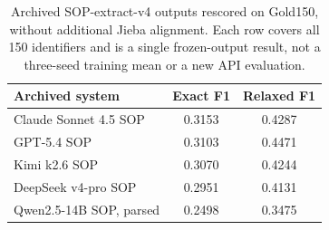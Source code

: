 \begin{table}[htbp]
\caption{Archived SOP-extract-v4 outputs rescored on Gold150, without additional Jieba alignment. Each row covers all 150 identifiers and is a single frozen-output result, not a three-seed training mean or a new API evaluation.}
\label{tab:appendix-f-sop}
\centering
\small
\begin{tabularx}{\linewidth}{@{}Lcc@{}}
\toprule
Archived system & Exact F1 & Relaxed F1 \\
\midrule
Claude Sonnet 4.5 SOP & 0.3153 & 0.4287 \\
GPT-5.4 SOP & 0.3103 & 0.4471 \\
Kimi k2.6 SOP & 0.3070 & 0.4244 \\
DeepSeek v4-pro SOP & 0.2951 & 0.4131 \\
Qwen2.5-14B SOP, parsed & 0.2498 & 0.3475 \\
\bottomrule
\end{tabularx}
\end{table}
